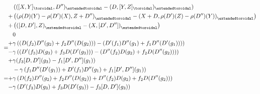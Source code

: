 \begin{enumerate}
$$\begin{aligned}
                                &
                                \begin{aligned}
                                    & \left( ( [X, Y]_{\toroidal}, D'')_{\extendedtoroidal} - (D, [Y, Z]_{\toroidal})_{\extendedtoroidal} \right)
                                    \\
                                    + & \left( \left(\rho(D)(Y) - \rho(D')(X), Z + D'' \right)_{\extendedtoroidal} - \left( X + D, \rho(D')(Z) - \rho(D'')(Y) \right)_{\extendedtoroidal} \right)
                                    \\
                                    + & \left( \left( [D, D'], Z \right)_{\extendedtoroidal} - \left(X, [D', D'']\right)_{\extendedtoroidal} \right)
                                \end{aligned}
                                \\
                                = &
                                \begin{aligned}
                                    & 0
                                    \\
                                    + & \gamma\left( \left( D(f_2) D''(g_2) + f_2 D''( D(g_2) ) \right) - \left( D'(f_1) D''(g_1) + f_1 D''( D'(g_1) ) \right) \right)
                                    \\
                                    - & \gamma\left( \left( D'(f_3) D(g_3) + f_3 D( D'(g_3) ) \right) - \left( D''(f_2) D(g_2) + f_2 D( D''(g_2) ) \right) \right)
                                    \\
                                    + & \gamma( f_3 [D, D'](g_3) - f_1 [D', D''](g_1) )
                                \end{aligned}
                                \\
                                = &
                                \begin{aligned}
                                    & -\gamma\left( f_1 D''( D'(g_1) ) + D'(f_1) D''(g_1) + f_1[D', D''](g_1) \right)
                                    \\
                                    + & \gamma\left( D(f_2) D''(g_2) + f_2 D''( D(g_2) ) + D''(f_2) D(g_2) + f_2 D( D''(g_2) ) \right)
                                    \\
                                    - & \gamma\left( D'(f_3) D(g_3) + f_3 D( D'(g_3) ) - f_3 [D, D'](g_3) \right)
                                \end{aligned}

\end{aligned}$$
\end{enumerate}
